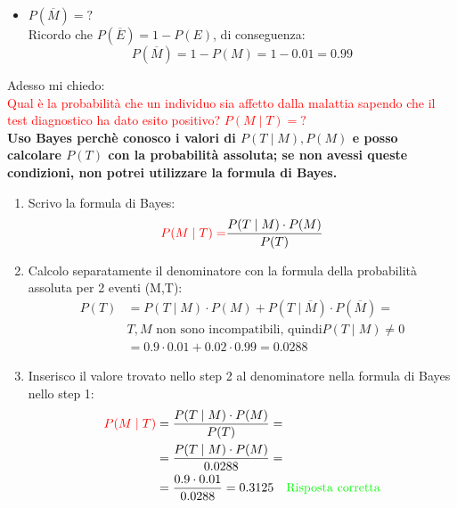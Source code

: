 \documentclass{article}  %
\theoremstyle{definition}
\begin{document}
\begin{esercizio}[Esercizio 1]
\begin{itemize}
		      Ricordo che $P(E)=1-P(\overline{E})$, di conseguenza:
		      \[
			      P(T \mid \overline{M})=1-P(\overline{T} \mid \overline{M})=1-0.98=0.02
		      \]
		\item $P(\overline{M})=?$ \\
		      Ricordo che $P(\overline{E})=1-P(E)$, di conseguenza:
		      \[
			      P(\overline{M})=1-P(M)=1-0.01=0.99
		      \]
	\end{itemize}
	Adesso mi chiedo: \\
	\textcolor{red}{Qual è la probabilità che un individuo sia affetto dalla malattia sapendo che il test diagnostico ha dato esito positivo? $P(M \mid T)=?$} \\
	\textbf{Uso Bayes perchè conosco i valori di $P(T \mid M), P(M)$ e posso calcolare $P(T)$ con la probabilità assoluta; se non avessi queste condizioni, non potrei
		utilizzare la formula di Bayes.}
	\begin{enumerate}
		\item Scrivo la formula di Bayes:
		      \[
			      \textcolor{red}{P(M \mid T)=}\frac{P(T \mid M)\cdot P(M)}{P(T)}
		      \]
		\item Calcolo separatamente il denominatore con la formula della probabilità assoluta per 2 eventi (M,T):
		      \begin{align*}
			      P(T)
			       & = P(T \mid M) \cdot P(M)+P(T \mid \overline{M}) \cdot P(\overline{M}) = \\
			       & \text{$T,M$ non sono incompatibili, quindi} P(T \mid M) \neq 0          \\
			       & = 0.9 \cdot 0.01 + 0.02 \cdot 0.99 = 0.0288
		      \end{align*}
		\item Inserisco il valore trovato nello step 2 al denominatore nella formula di Bayes nello step 1:
		      \begin{align*}
			      \textcolor{red}{P(M \mid T)}
			       & = \frac{P(T \mid M)\cdot P(M)}{P(T)} =                                                  \\
			       & = \frac{P(T \mid M)\cdot P(M)}{0.0288} =                                                \\
			       & = \frac{0.9\cdot 0.01}{0.0288}=0.3125 \quad \textcolor{green}{\text{Risposta corretta}}
		      \end{align*}
	\end{enumerate}
\end{esercizio}
\end{document}
